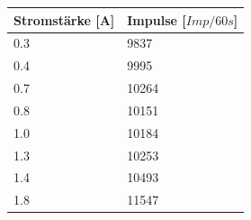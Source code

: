     \begin{minipage}{\linewidth}
        \begin{table}[H]
            \centering
        
        \begin{tabular}{ll}
            \toprule
            Stromstärke [A] & Impulse [$Imp/60s$]\\
            \midrule
            0.3 &  9837  \\ 
            0.4 &  9995  \\ 
            0.7 &  10264 \\
            0.8 &  10151 \\
            1.0 &  10184 \\
            1.3 &  10253 \\
            1.4 &  10493 \\
            1.8 &  11547 \\
            \bottomrule
            
        \end{tabular}
        \label{tab:7d2}
        \end{table}
        \end{minipage}




